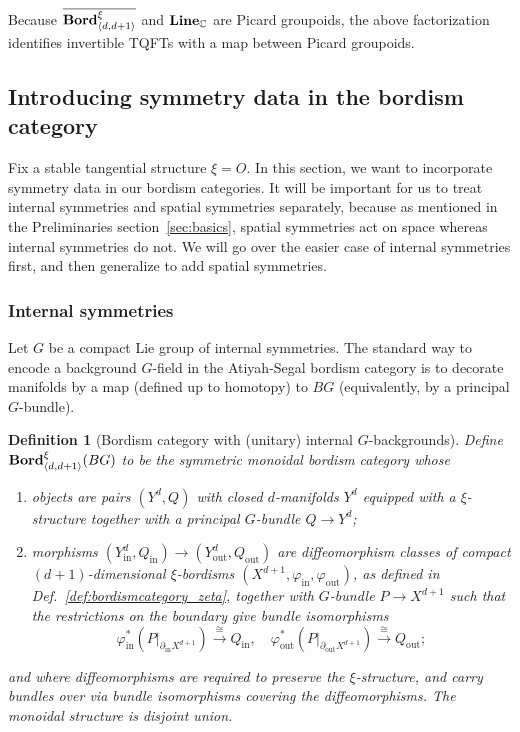 \documentclass[aps,prx,reprint,superscriptaddress,twocolumn,amsmath,amssymb,amsfonts, nofootinbib]{revtex4-2}
\newcommand{\bordd}{{\bf Bord}_{\langle d, d+1\rangle}}
\newcommand{\Line}{{\bf Line}_{\mathbb{C}}}
\theoremstyle{apsstyle}
\newtheorem{definition}[theorem]{Definition}
\begin{document}
\bigskip 

\noindent Because $\overline{\bordd^{\xi}}$ and $\Line$ are Picard groupoids, the above factorization identifies invertible TQFTs with a map between Picard groupoids.

\subsection{Introducing symmetry data in the bordism category}
\label{sec:bordism_with_symmetry}

Fix a stable tangential structure $\xi=O$. In this section, we want to incorporate symmetry data in our bordism categories. It will be important for us to treat internal symmetries and spatial symmetries separately, because as mentioned in the Preliminaries section~\ref{sec:basics}, spatial symmetries act on space whereas internal symmetries do not. We will go over the easier case of internal symmetries first, and then generalize to add spatial symmetries.

\subsubsection{Internal symmetries}
\label{app:bordism_internal_sym}

Let $G$ be a compact Lie group of internal symmetries. The standard way to encode a background $G$-field in the Atiyah-Segal bordism category is to decorate manifolds by a map (defined up to homotopy) to $BG$ (equivalently, by a principal $G$-bundle).

\bigskip 

\begin{definition}[Bordism category with (unitary) internal $G$-backgrounds]
\label{def:bordism_BG_background}
Define $\bordd^{\xi}(BG)$ to be the symmetric monoidal bordism category whose
\begin{enumerate}[label=\roman*,leftmargin=1.7em]
\item objects are pairs $(Y^{d}, Q)$ with closed $d$-manifolds $Y^{d}$ equipped with a $\xi$-structure together with a principal $G$-bundle $Q\to Y^{d}$;
\item morphisms $(Y^{d}_{\mathrm{in}},Q_{\mathrm{in}})\to (Y^{d}_{\mathrm{out}},Q_{\mathrm{out}})$ are diffeomorphism classes of compact $(d{+}1)$-dimensional $\xi$-bordisms $(X^{d+1}, \varphi_{\mathrm{in}}, \varphi_{\mathrm{out}})$, as defined in Def.~\ref{def:bordismcategory_zeta}, together with $G$-bundle $P\to X^{d+1}$ such that the restrictions on the boundary give bundle isomorphisms 
\begin{equation*}
\varphi_{\mathrm{in}}^{*}(P\vert_{\partial_{\mathrm{in}}X^{d+1}}) \xrightarrow[]{\cong} Q_{\mathrm{in}},\quad \varphi_{\mathrm{out}}^{*}(P\vert_{\partial_{\mathrm{out}}X^{d+1}}) \xrightarrow[]{\cong} Q_{\mathrm{out}};\end{equation*}
\end{enumerate}
and where diffeomorphisms are required to preserve the $\xi$-structure, and carry bundles over via bundle isomorphisms covering the diffeomorphisms. The monoidal structure is disjoint union.
\end{definition}
\end{document}
